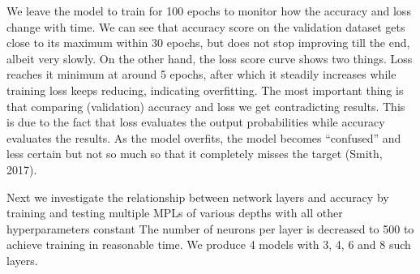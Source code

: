 \documentclass{article}
\begin{document}
We leave the model to train for 100 epochs to monitor how the accuracy and loss change with time.
We can see that accuracy score on the validation dataset gets close to its maximum within 30 epochs, but does not stop improving till the end, albeit very slowly.
On the other hand, the loss score curve shows two things.
Loss reaches it minimum at around 5 epochs, after which it steadily increases while training loss keeps reducing, indicating overfitting.
The most important thing is that comparing (validation) accuracy and loss we get contradicting results.
This is due to the fact that loss evaluates the output probabilities while accuracy evaluates the results.
As the model overfits, the model becomes “confused” and less certain but not so much so that it completely misses the target (Smith, 2017).

Next we investigate the relationship between network layers and accuracy by training and testing multiple MPLs of various depths with all other hyperparameters constant
The number of neurons per layer is decreased to 500 to achieve training in reasonable time.
We produce 4 models with 3, 4, 6 and 8 such layers.
\end{document}
